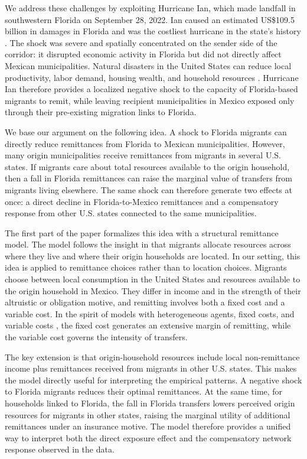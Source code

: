 We address these challenges by exploiting Hurricane Ian, which made landfall in southwestern Florida on September 28, 2022. Ian caused an estimated US\$109.5 billion in damages in Florida and was the costliest hurricane in the state's history \parencite{nhc_ian_2026}. The shock was severe and spatially concentrated on the sender side of the corridor: it disrupted economic activity in Florida but did not directly affect Mexican municipalities. Natural disasters in the United States can reduce local productivity, labor demand, housing wealth, and household resources \parencite{natural_disasters_US}. Hurricane Ian therefore provides a localized negative shock to the capacity of Florida-based migrants to remit, while leaving recipient municipalities in Mexico exposed only through their pre-existing migration links to Florida.

We base our argument on the following idea. A shock to Florida migrants can directly reduce remittances from Florida to Mexican municipalities. However, many origin municipalities receive remittances from migrants in several U.S. states. If migrants care about total resources available to the origin household, then a fall in Florida remittances can raise the marginal value of transfers from migrants living elsewhere. The same shock can therefore generate two effects at once: a direct decline in Florida-to-Mexico remittances and a compensatory response from other U.S. states connected to the same municipalities.

The first part of the paper formalizes this idea with a structural remittance model. The model follows the insight in \textcite{albert_monras_2022} that migrants allocate resources across where they live and where their origin households are located. In our setting, this idea is applied to remittance choices rather than to location choices. Migrants choose between local consumption in the United States and resources available to the origin household in Mexico. They differ in income and in the strength of their altruistic or obligation motive, and remitting involves both a fixed cost and a variable cost. In the spirit of models with heterogeneous agents, fixed costs, and variable costs \parencite{melitz2003}, the fixed cost generates an extensive margin of remitting, while the variable cost governs the intensity of transfers.

The key extension is that origin-household resources include local non-remittance income plus remittances received from migrants in other U.S. states. This makes the model directly useful for interpreting the empirical patterns. A negative shock to Florida migrants reduces their optimal remittances. At the same time, for households linked to Florida, the fall in Florida transfers lowers perceived origin resources for migrants in other states, raising the marginal utility of additional remittances under an insurance motive. The model therefore provides a unified way to interpret both the direct exposure effect and the compensatory network response observed in the data.

